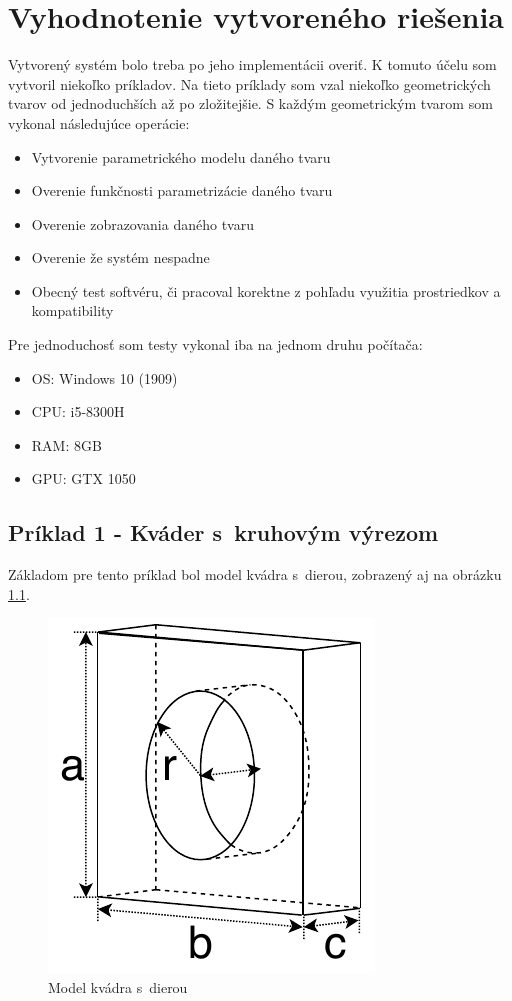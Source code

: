 \chapter{Vyhodnotenie vytvoreného riešenia}\label{sec:zhodnotenie}
Vytvorený systém bolo treba po jeho implementácii overiť. K tomuto účelu som vytvoril niekoľko príkladov. Na tieto príklady som vzal niekoľko geometrických tvarov od jednoduchších až po zložitejšie. S každým geometrickým tvarom som vykonal následujúce operácie:
\begin{itemize}
    \item Vytvorenie parametrického modelu daného tvaru
    \item Overenie funkčnosti parametrizácie daného tvaru
    \item Overenie zobrazovania daného tvaru
    \item Overenie že systém nespadne
    \item Obecný test softvéru, či pracoval korektne z pohľadu využitia prostriedkov a kompatibility
\end{itemize}
Pre jednoduchosť som testy vykonal iba na jednom druhu počítača: 
% 
\begin{itemize}
    \item OS: Windows 10 (1909)
    \item CPU: i5-8300H
    \item RAM: 8GB
    \item GPU: GTX 1050
\end{itemize}

\newpage
\section*{Príklad 1 - Kváder s~kruhovým výrezom}
Základom pre tento príklad bol model kvádra s~dierou, zobrazený aj na obrázku \ref{fig:A4vyhodnotenie}.

\begin{figure}[H]
	\centering
	\includegraphics[height=0.3\textwidth]{obrazky-figures/Examples/A4x.pdf}
	\caption{Model kvádra s~dierou}
	\label{fig:A4vyhodnotenie}
\end{figure}

